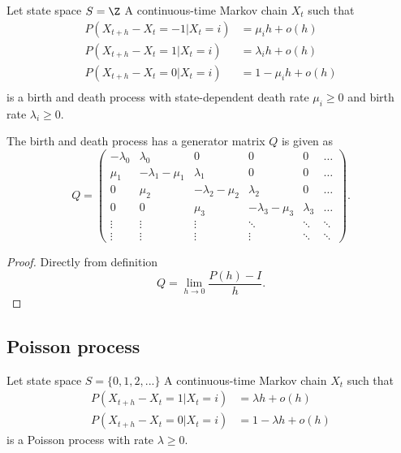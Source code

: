 \begin{refsection}
\begin{definition}\cite[176]{privault2013understanding} Let state space $S=\Z$
	A continuous-time Markov chain $X_t$ such that 
	\begin{align*}
	P(X_{t+h} - X_t = -1| X_t = i) &= \mu_i h + o(h)\\
	P(X_{t+h} - X_t = 1| X_t = i) &= \lambda_i h + o(h)\\	
	P(X_{t+h} - X_t = 0| X_t = i) &= 1 - \mu_i h + o(h)\\
	\end{align*}
	is a birth and death process with state-dependent death rate $\mu_i\geq 0$ and birth rate $\lambda_i\geq 0$.
\end{definition}

\begin{lemma}
	The birth and death process has a generator matrix $Q$ is given as
	$$Q=\begin{pmatrix}
	-\lambda_0 & \lambda_0 & 0 & 0 & 0 & \dots \\ 
	\mu_1 & -\lambda_1-\mu_1 & \lambda_1 & 0 & 0 & \dots\\ 
	0 & \mu_2 & -\lambda_2-\mu_2 & \lambda_2 & 0 & \dots\\ 
	0 & 0 & \mu_3 & -\lambda_3-\mu_3  & \lambda_3 & \dots\\ 
	\vdots & \vdots & \vdots  & \ddots & \ddots & \ddots\\ 
	\vdots & \vdots  & \vdots &\vdots  & \ddots & \ddots
	\end{pmatrix}.$$
\end{lemma}
\begin{proof}
	Directly from definition $$Q = \lim_{h\to 0}\frac{P(h) - I}{h}.$$
\end{proof}

\subsection{Poisson process}\label{ch:continuous-time-markov-chain:def:Poissonprocess}
\begin{definition}Let state space $S=\{0,1,2,...\}$
	A continuous-time Markov chain $X_t$ such that 
	\begin{align*}
	P(X_{t+h} - X_t = 1| X_t = i) &= \lambda h + o(h)\\
	P(X_{t+h} - X_t = 0| X_t = i) &= 1 - \lambda h + o(h)
	\end{align*}
	is a Poisson process with  rate $\lambda\geq 0$.
\end{definition}


\end{refsection}
